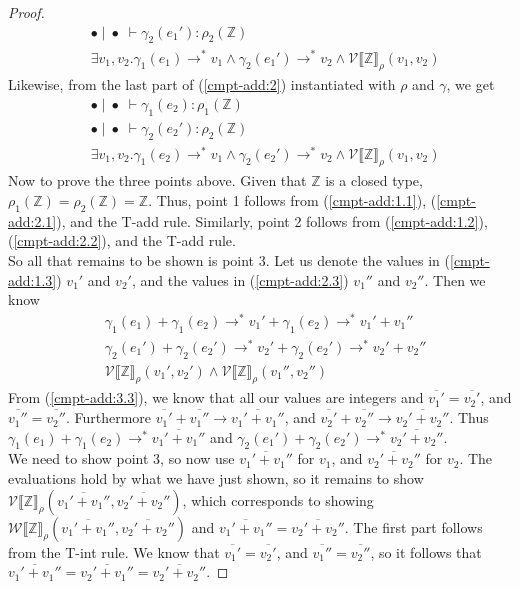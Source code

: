 \documentclass[a4paper, 11pt]{report}
\theoremstyle{definition}
\newcommand{\expr}{e}
\newcommand{\val}{v}
\newcommand{\Num}[1]{\overline{#1}}
\newcommand{\Tint}{\mathbb{Z}}
\newcommand{\emptenv}{\bullet}
\newcommand{\empvenv}{\bullet}
\newcommand{\jdg}[4]{#1 \; | \; #2 \; \vdash #3 : #4}
\newcommand{\step}{\rightarrow}
\newcommand{\stepS}{\rightarrow^*}
\newcommand{\WtInp}[2]{\mathcal{W} \llbracket #1 \rrbracket_{#2}}
\newcommand{\ValInp}[2]{\mathcal{V} \llbracket #1 \rrbracket_{#2}}
\begin{document}
\begin{proof}
\begin{align}
    &\jdg{\emptenv}{\empvenv}{\gamma_2(\expr_1')}{\rho_2(\Tint)}\label{cmpt-add:1.2}\\
    &\exists \val_1, \val_2 . \gamma_1(\expr_1) \stepS \val_1 \land \gamma_2(\expr_1') \stepS \val_2 \land \ValInp{\Tint}{\rho}(\val_1, \val_2)\label{cmpt-add:1.3}
  \end{align}
  Likewise, from the last part of (\ref*{cmpt-add:2}) instantiated with $\rho$ and $\gamma$, we get
  \begin{align}
    &\jdg{\emptenv}{\empvenv}{\gamma_1(\expr_2)}{\rho_1(\Tint)}\label{cmpt-add:2.1}\\
    &\jdg{\emptenv}{\empvenv}{\gamma_2(\expr_2')}{\rho_2(\Tint)}\label{cmpt-add:2.2}\\
    &\exists \val_1, \val_2 . \gamma_1(\expr_2) \stepS \val_1 \land \gamma_2(\expr_2') \stepS \val_2 \land \ValInp{\Tint}{\rho}(\val_1, \val_2)\label{cmpt-add:2.3}
  \end{align}
  Now to prove the three points above. Given that $\Tint$ is a closed type, $\rho_1(\Tint) = \rho_2(\Tint) = \Tint$. Thus, point 1 follows from (\ref*{cmpt-add:1.1}), (\ref*{cmpt-add:2.1}), and the T-add rule. Similarly, point 2 follows from (\ref*{cmpt-add:1.2}), (\ref*{cmpt-add:2.2}), and the T-add rule.\\
  So all that remains to be shown is point 3. Let us denote the values in (\ref*{cmpt-add:1.3}) $\val_1'$ and $\val_2'$, and the values in (\ref*{cmpt-add:2.3}) $\val_1''$ and $\val_2''$. Then we know
  \begin{align}
    &\gamma_1(\expr_1) + \gamma_1(\expr_2) \stepS \val_1' + \gamma_1(\expr_2) \stepS \val_1' + \val_1''\label{cmpt-add:3.1}\\
    &\gamma_2(\expr_1') + \gamma_2(\expr_2') \stepS \val_2' + \gamma_2(\expr_2') \stepS \val_2' + \val_2''\label{cmpt-add:3.2}\\
    &\ValInp{\Tint}{\rho}(\val_1', \val_2') \land \ValInp{\Tint}{\rho}(\val_1'', \val_2'')\label{cmpt-add:3.3}
  \end{align}
  From (\ref*{cmpt-add:3.3}), we know that all our values are integers and $\Num{\val_1'} = \Num{\val_2'}$, and $\Num{\val_1''} = \Num{\val_2''}$. Furthermore
  $\Num{\val_1'} + \Num{\val_1''} \step \Num{\val_1' + \val_1''}$, and $\Num{\val_2'} + \Num{\val_2''} \step \Num{\val_2' + \val_2''}$. Thus $\gamma_1(\expr_1) + \gamma_1(\expr_2) \stepS \Num{\val_1' + \val_1''}$ and $\gamma_2(\expr_1') + \gamma_2(\expr_2') \stepS \Num{\val_2' + \val_2''}$.\\
  We need to show point 3, so now use $\Num{\val_1' + \val_1''}$ for $\val_1$, and $\Num{\val_2' + \val_2''}$ for $\val_2$. The evaluations hold by what we have just shown, so it remains to show $\ValInp{\Tint}{\rho}(\Num{\val_1' + \val_1''}, \Num{\val_2' + \val_2''})$, which corresponds to showing $\WtInp{\Tint}{\rho}(\Num{\val_1' + \val_1''}, \Num{\val_2' + \val_2''})$ and $\Num{\val_1' + \val_1''} = \Num{\val_2' + \val_2''}$. The first part follows from the T-int rule. We know that $\Num{\val_1'} = \Num{\val_2'}$, and $\Num{\val_1''} = \Num{\val_2''}$, so it follows that $\Num{\val_1' + \val_1''} = \Num{\val_2' + \val_1''} = \Num{\val_2' + \val_2''}$.
\end{proof}
\end{document}

